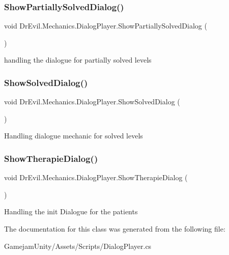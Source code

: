 \subsubsection{\texorpdfstring{Show\+Partially\+Solved\+Dialog()}{ShowPartiallySolvedDialog()}}
{\footnotesize\ttfamily void Dr\+Evil.\+Mechanics.\+Dialog\+Player.\+Show\+Partially\+Solved\+Dialog (\begin{DoxyParamCaption}{ }\end{DoxyParamCaption})\hspace{0.3cm}{\ttfamily [inline]}}



handling the dialogue for partially solved levels 

\mbox{\label{class_dr_evil_1_1_mechanics_1_1_dialog_player_ad6012eb1ba848915bfc90a73ca04c6b6}} 
\subsubsection{\texorpdfstring{Show\+Solved\+Dialog()}{ShowSolvedDialog()}}
{\footnotesize\ttfamily void Dr\+Evil.\+Mechanics.\+Dialog\+Player.\+Show\+Solved\+Dialog (\begin{DoxyParamCaption}{ }\end{DoxyParamCaption})\hspace{0.3cm}{\ttfamily [inline]}}



Handling dialogue mechanic for solved levels 

\mbox{\label{class_dr_evil_1_1_mechanics_1_1_dialog_player_a00c6b192050d5dcde49caf9bd7e124b0}} 
\subsubsection{\texorpdfstring{Show\+Therapie\+Dialog()}{ShowTherapieDialog()}}
{\footnotesize\ttfamily void Dr\+Evil.\+Mechanics.\+Dialog\+Player.\+Show\+Therapie\+Dialog (\begin{DoxyParamCaption}{ }\end{DoxyParamCaption})\hspace{0.3cm}{\ttfamily [inline]}}



Handling the init Dialogue for the patients 



The documentation for this class was generated from the following file\+:\begin{DoxyCompactItemize}
\item 
Gamejam\+Unity/\+Assets/\+Scripts/Dialog\+Player.\+cs\end{DoxyCompactItemize}
